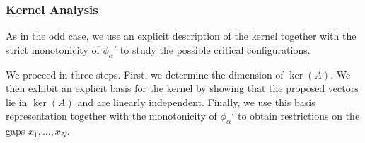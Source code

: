 \documentclass{article}
\begin{document}


\subsubsection{Kernel Analysis}

As in the odd case, we use an explicit description of the kernel together with the strict monotonicity of $\phi_\alpha'$ to study the possible critical configurations.

We proceed in three steps. First, we determine the dimension of $\ker(A)$. We then exhibit an explicit basis for the kernel by showing that the proposed vectors lie in $\ker(A)$ and are linearly independent. Finally, we use this basis representation together with the monotonicity of $\phi_\alpha'$ to obtain restrictions on the gaps $x_1,\dots,x_N$.
\end{document}
